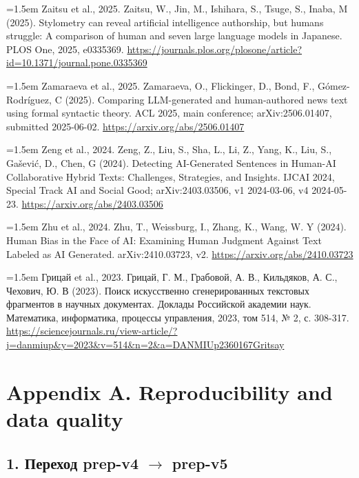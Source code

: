 \documentclass[11pt,a4paper]{article}
\renewcommand{\_}{\textunderscore\allowbreak}
\begin{document}
\noindent\hangindent=1.5em Zaitsu et al., 2025. Zaitsu, W., Jin, M., Ishihara, S., Tsuge, S., Inaba, M (2025). Stylometry can reveal artificial intelligence authorship, but humans struggle: A comparison of human and seven large language models in Japanese. PLOS One, 2025, e0335369. \url{https://journals.plos.org/plosone/article?id=10.1371/journal.pone.0335369}\par\smallskip

\noindent\hangindent=1.5em Zamaraeva et al., 2025. Zamaraeva, O., Flickinger, D., Bond, F., G\'omez-Rodr\'iguez, C (2025). Comparing LLM-generated and human-authored news text using formal syntactic theory. ACL 2025, main conference; arXiv:2506.01407, submitted 2025-06-02. \url{https://arxiv.org/abs/2506.01407}\par\smallskip

\noindent\hangindent=1.5em Zeng et al., 2024. Zeng, Z., Liu, S., Sha, L., Li, Z., Yang, K., Liu, S., Ga\v{s}evi\'c, D., Chen, G (2024). Detecting AI-Generated Sentences in Human-AI Collaborative Hybrid Texts: Challenges, Strategies, and Insights. IJCAI 2024, Special Track AI and Social Good; arXiv:2403.03506, v1 2024-03-06, v4 2024-05-23. \url{https://arxiv.org/abs/2403.03506}\par\smallskip

\noindent\hangindent=1.5em Zhu et al., 2024. Zhu, T., Weissburg, I., Zhang, K., Wang, W. Y (2024). Human Bias in the Face of AI: Examining Human Judgment Against Text Labeled as AI Generated. arXiv:2410.03723, v2. \url{https://arxiv.org/abs/2410.03723}\par\smallskip

\noindent\hangindent=1.5em Грицай et al., 2023. Грицай, Г. М., Грабовой, А. В., Кильдяков, А. С., Чехович, Ю. В (2023). Поиск искусственно сгенерированных текстовых фрагментов в научных документах. Доклады Российской академии наук. Математика, информатика, процессы управления, 2023, том 514, № 2, с. 308-317. \url{https://sciencejournals.ru/view-article/?j=danmiup&y=2023&v=514&n=2&a=DANMIUp2360167Gritsay}\par\smallskip

\section{Appendix A. Reproducibility and data quality}

\subsection{1. Переход prep-v4 $\to$ prep-v5}
\end{document}
